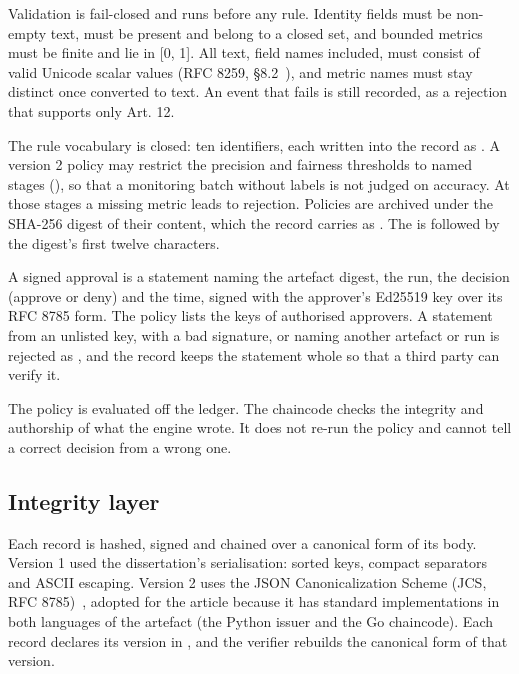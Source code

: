 Validation is fail-closed and runs before any rule. Identity fields must be non-empty text,  must be present and belong to a closed set, and bounded metrics must be finite and lie in {[}0, 1{]}. All text, field names included, must consist of valid Unicode scalar values (RFC 8259, \S 8.2~\cite{rfc8259}), and metric names must stay distinct once converted to text. An event that fails is still recorded, as a rejection that supports only Art. 12.

The rule vocabulary is closed: ten identifiers, each written into the record as . A version 2 policy may restrict the precision and fairness thresholds to named stages (), so that a monitoring batch without labels is not judged on accuracy. At those stages a missing metric leads to rejection. Policies are archived under the SHA-256 digest of their content, which the record carries as . The  is  followed by the digest's first twelve characters.

A signed approval is a statement naming the artefact digest, the run, the decision (approve or deny) and the time, signed with the approver's Ed25519 key over its RFC 8785 form. The policy lists the keys of authorised approvers. A statement from an unlisted key, with a bad signature, or naming another artefact or run is rejected as , and the record keeps the statement whole so that a third party can verify it.

The policy is evaluated off the ledger. The chaincode checks the integrity and authorship of what the engine wrote. It does not re-run the policy and cannot tell a correct decision from a wrong one.

\subsection{Integrity layer}

Each record is hashed, signed and chained over a canonical form of its body. Version 1 used the dissertation's serialisation: sorted keys, compact separators and ASCII escaping. Version 2 uses the JSON Canonicalization Scheme (JCS, RFC 8785)~\cite{rfc8785}, adopted for the article because it has standard implementations in both languages of the artefact (the Python issuer and the Go chaincode). Each record declares its version in , and the verifier rebuilds the canonical form of that version.

